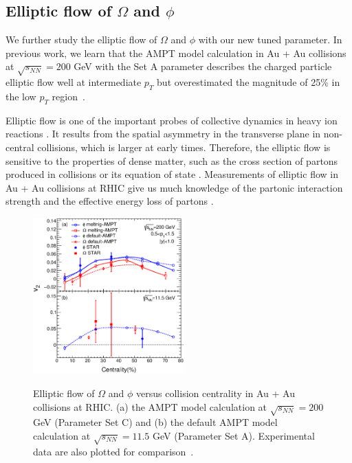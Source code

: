 \documentclass[twocolumn,aps,prc,showpacs,superscriptaddress,preprintnumbers,floatfix,nofootinbib]{revtex4}
\begin{document}
\begin{CJK*}{GBK}{song}
\subsection{Elliptic flow of $\Omega$ and $\phi$}

We further study the elliptic flow of $\Omega$ and $\phi$ with our new tuned parameter. In previous work, we  learn that the AMPT model calculation in Au + Au collisions at $\sqrt{s_{NN}} = 200$ GeV with the Set A parameter describes the charged particle elliptic flow well at intermediate $p_T$ but overestimated the magnitude of 25\% in the low $p_T$ region~\cite{AMPT-phi-v2}.

Elliptic flow is one of the important probes of collective dynamics in heavy ion reactions \cite{probe}. It results from the spatial asymmetry in the transverse plane in non-central collisions, which is larger at early times. Therefore, the elliptic flow is sensitive to the properties of dense matter, such as the cross section of partons produced in collisions \cite{cs1,cs2,cs3,cs4} or its equation of state \cite{EOS1,EOS2,EOS3,EOS4}. Measurements of elliptic flow in Au + Au collisions at RHIC  give us much knowledge of the partonic interaction strength and the effective energy loss of partons \cite{flow_200_Omega,flow_200_phi,flow_115}.
    \begin{figure}[htbp]
      \includegraphics[width=0.52\textwidth]{Fig6_paper_v2.eps}\\
      \caption{Elliptic flow of $\Omega$ and $\phi$ versus collision centrality in Au + Au collisions at RHIC. (a) the AMPT model calculation at $\sqrt{s_{NN}} =  200$ GeV (Parameter Set C) and (b) the default AMPT model calculation at $\sqrt{s_{NN}} = 11.5$ GeV (Parameter Set A). Experimental data are also plotted for comparison~\cite{flow_200_Omega,flow_200_phi,flow_115}.}
      \label{flow}
    \end{figure}


\end{CJK*}
\end{document}
